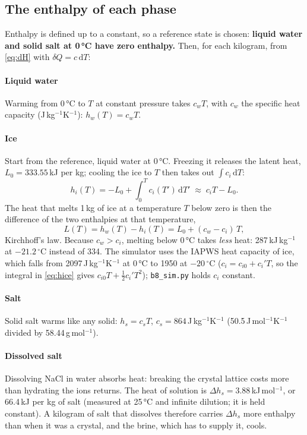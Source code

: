 \documentclass[11pt,a4paper]{article}
\newcommand{\dC}{\,^{\circ}\mathrm{C}}
\newcommand{\code}[1]{\texttt{#1}}
\begin{document}
\subsection{The enthalpy of each phase}
\label{sec:enthalpy}
Enthalpy is defined up to a constant, so a reference state is chosen: \textbf{liquid water and solid
salt at 0\,°C have zero enthalpy.} Then, for each kilogram, from \eqref{eq:dH} with $\delta Q = c\,\mathrm dT$:

\paragraph{Liquid water} Warming from 0\,°C to $T$ at constant pressure takes $c_w T$, with $c_w$ the
specific heat capacity (J\,kg$^{-1}$K$^{-1}$): $h_w(T) = c_w T$.

\paragraph{Ice} Start from the reference, liquid water at 0\,°C. Freezing it releases the latent
heat, $L_0 = 333.55$\,kJ per kg; cooling the ice to $T$ then takes out $\int c_i\,\mathrm dT$:
\begin{equation}
h_i(T) = -L_0 + \int_0^T c_i(T')\,\mathrm dT' \;\approx\; c_i T - L_0 .
\label{eq:hice}
\end{equation}
The heat that melts 1\,kg of ice at a temperature $T$ below zero is then the difference of the two
enthalpies at that temperature,
\begin{equation}
L(T) = h_w(T) - h_i(T) = L_0 + (c_w - c_i)\,T ,
\label{eq:kirchhoff}
\end{equation}
Kirchhoff's law. Because $c_w > c_i$, melting below 0\,°C takes \emph{less} heat: 287\,kJ\,kg$^{-1}$
at $-21.2\dC$ instead of 334. The simulator uses the IAPWS heat capacity of ice, which falls from
2097\,J\,kg$^{-1}$K$^{-1}$ at 0\,°C to 1950 at $-20\dC$ ($c_i = c_{i0} + c_i' T$, so the integral in
\eqref{eq:hice} gives $c_{i0}T + \tfrac12 c_i' T^2$); \code{b8\_sim.py} holds $c_i$ constant.

\paragraph{Salt} Solid salt warms like any solid: $h_s = c_s T$, $c_s = 864$\,J\,kg$^{-1}$K$^{-1}$
(50.5\,J\,mol$^{-1}$K$^{-1}$ divided by 58.44\,g\,mol$^{-1}$).

\paragraph{Dissolved salt} Dissolving NaCl in water absorbs heat: breaking the crystal lattice costs
more than hydrating the ions returns. The heat of solution is $\Delta h_s = 3.88$\,kJ\,mol$^{-1}$, or
66.4\,kJ per kg of salt (measured at 25\,°C and infinite dilution; it is held constant). A kilogram of
salt that dissolves therefore carries $\Delta h_s$ more enthalpy than when it was a crystal, and the
brine, which has to supply it, cools.
\end{document}
